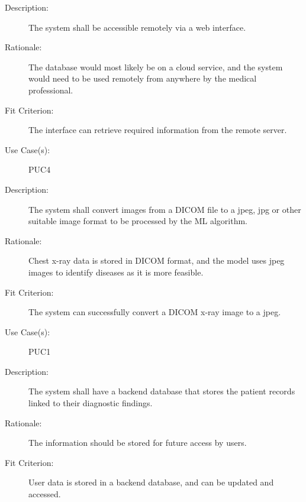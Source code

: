 \documentclass[12pt]{article}
\begin{document}
\begin{enumerate}[label=FR\arabic*., series=frs]
\begin{item}
    \end{item}
    \begin{item}
        \begin{description}
            \item[Description:] The system shall be accessible remotely via a web interface.
            \item[Rationale:] The database would most likely be on a cloud service, and the system would need to be used remotely from anywhere by the medical professional.
            \item[Fit Criterion:] The interface can retrieve required information from the remote server.
            \item[Use Case(s):] PUC4
        \end{description}
    \end{item}
     \begin{item}
         \begin{description}
             \item[Description:] The system shall convert images from a DICOM file to a jpeg, jpg or other suitable image format to be processed by the ML algorithm.
             \item[Rationale:] Chest x-ray data is stored in DICOM format, and the model uses jpeg images to identify diseases as it is more feasible.
             \item[Fit Criterion:] The system can successfully convert a DICOM x-ray image to a jpeg.
             \item[Use Case(s):] PUC1
         \end{description}
     \end{item}
    \begin{item}
        \begin{description}
            \item[Description:] The system shall have a backend database that stores the patient records linked to their diagnostic findings.
            \item[Rationale:] The information should be stored for future access by users.
            \item[Fit Criterion:] User data is stored in a backend database, and can be updated and accessed.

\end{description}
\end{item}
\end{enumerate}
\end{document}
